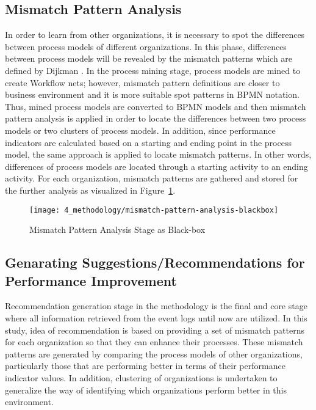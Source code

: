 \subsection{Mismatch Pattern Analysis}
\label{subsec:mismatch-pattern-analysis}
In order to learn from other organizations, it is necessary to spot the differences between process models of different organizations. In this phase, differences between process models will be revealed by the mismatch patterns which are defined by Dijkman \cite{dijkman2007mismatch}. In the process mining stage, process models are mined to create Workflow nets; however, mismatch pattern definitions are closer to business environment and it is more suitable spot patterns in BPMN notation. Thus, mined process models are converted to BPMN models and then mismatch pattern analysis is applied in order to locate the differences between two process models or two clusters of process models. In addition, since performance indicators are calculated based on a starting and ending point in the process model, the same approach is applied to locate mismatch patterns. In other words, differences of process models are located through a starting activity to an ending activity. For each organization, mismatch patterns are gathered and stored for the further analysis as visualized in Figure~\ref{fig:mismatch-pattern-analysis-blackbox}.
\begin{figure}
  \centering
  \texttt{[image: 4\_methodology/mismatch-pattern-analysis-blackbox]}
  \caption{Mismatch Pattern Analysis Stage as Black-box}
  \label{fig:mismatch-pattern-analysis-blackbox}
\end{figure}

\subsection{Genarating Suggestions/Recommendations for Performance Improvement}
\label{subsec:recommendation-generation}
Recommendation generation stage in the methodology is the final and core stage where all information retrieved from the event logs until now are utilized. In this study, idea of recommendation is based on providing a set of mismatch patterns for each organization so that they can enhance their processes. These mismatch patterns are generated by comparing the process models of other organizations, particularly those that are performing better in terms of their performance indicator values. In addition, clustering of organizations is undertaken to generalize the way of identifying which organizations perform better in this environment.

